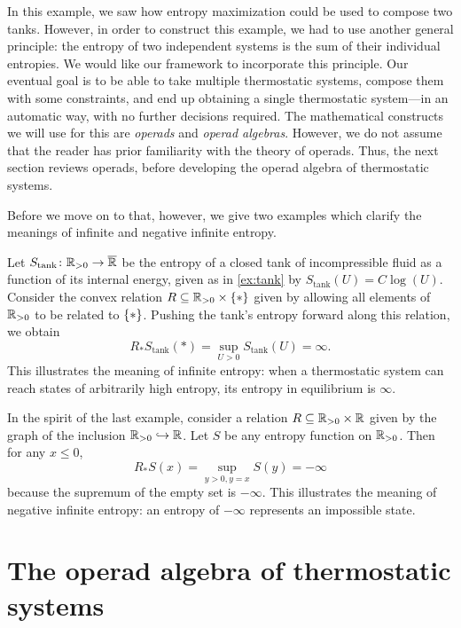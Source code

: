 \documentclass[12pt, reqno]{amsart}
\newcommand{\pos}{\real_{> 0}}
\newcommand{\extreal}{\overline{\real}}
\newcommand{\Stank}{S_{\mathrm{tank}}} %
\begin{document}
In this example, we saw how entropy maximization could be used to compose two tanks. However, in order to construct this example, we had to use another general principle: the entropy of two independent systems is the sum of their individual entropies.  We would like our framework to incorporate this principle.  Our eventual goal is to be able to take multiple thermostatic systems, compose them with some constraints, and end up obtaining a single thermostatic system---in an automatic way, with no further decisions required. The mathematical constructs we will use for this are \emph{operads} and \emph{operad algebras}. However, we do not assume that the reader has prior familiarity with the theory of operads. Thus, the next section reviews operads, before developing the operad algebra of thermostatic systems. 

Before we move on to that, however, we give two examples which clarify the meanings of infinite and negative infinite entropy.

\begin{example} \label{ex:infty}
    Let $\Stank \maps \pos \to \extreal$ be the entropy of a closed tank of incompressible fluid as a function of its internal energy, given as in \cref{ex:tank} by $\Stank(U) = C \log(U)$. Consider the convex relation $R \subseteq \pos \times \set{\ast}$ given by allowing all elements of $\pos$ to be related to $\{\ast\}$. Pushing the tank's entropy forward along this relation, we obtain
    \[ R_\ast \Stank(\ast) = \sup_{U > 0} \Stank(U) = \infty.\]
    This illustrates the meaning of infinite entropy: when a thermostatic system can reach states of arbitrarily high entropy, its entropy in equilibrium is $\infty$.
\end{example}

\begin{example} \label{ex:-infty}
    In the spirit of the last example, consider a relation $R \subseteq \pos \times \real$ given by the graph of the inclusion $\pos \hookrightarrow \real$. Let $S$ be any entropy function on $\pos$. Then for any $x \le 0$,
    \[ R_\ast S(x) = \sup_{y > 0, y = x} S(y) = -\infty \]
    because the supremum of the empty set is $-\infty$. This illustrates the meaning of negative infinite entropy: an entropy of $-\infty$ represents an impossible state.
\end{example}


\section{The operad algebra of thermostatic systems}
\label{sec:operads}
\end{document}
